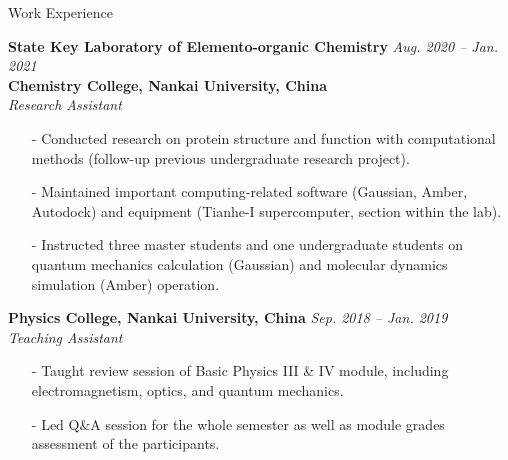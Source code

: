 \begin{rSection}{Work Experience}

    {\bf State Key Laboratory of Elemento-organic Chemistry} \hfill {\em Aug. 2020 -- Jan. 2021} 
    \\ {\bf Chemistry College, Nankai University, China}
    \\{\textit{Research Assistant}}
    \begin{itemize}
        \item[-] Conducted research on protein structure and function with computational methods (follow-up previous undergraduate research project).
        \item[-] Maintained important computing-related software (Gaussian, Amber, Autodock) and equipment (Tianhe-I supercomputer, section within the lab).
        \item[-] Instructed three master students and one undergraduate students on quantum mechanics calculation (Gaussian) and molecular dynamics simulation (Amber) operation.
    \end{itemize}

    {\bf Physics College, Nankai University, China} \hfill {\em Sep. 2018 -- Jan. 2019} 
    \\{\textit{Teaching Assistant}}
    \begin{itemize}
        \item[-] Taught review session of Basic Physics III \& IV module, including electromagnetism, optics, and quantum mechanics.
        \item[-] Led Q\&A session for the whole semester as well as module grades assessment of the participants.
    \end{itemize}
    
\end{rSection}